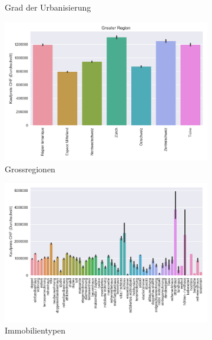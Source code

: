 \begin{figure}[h]
\begin{subfigure}{.5\textwidth}
  \caption{Grad der Urbanisierung} 
\end{subfigure}
\begin{subfigure}{.5\textwidth}
  \centering
  \includegraphics[width=\linewidth]{images/anhang/analysis/barplot_greater_region_id.png}
  \caption{Grossregionen} 
\end{subfigure}
\begin{subfigure}{.5\textwidth}
  \centering
  \includegraphics[width=\linewidth]{images/anhang/analysis/barplot_gruppen.png}
  \caption{Immobilientypen} 
\end{subfigure}
\begin{subfigure}{.5\textwidth}
  \centering

\end{subfigure}
\end{figure}

